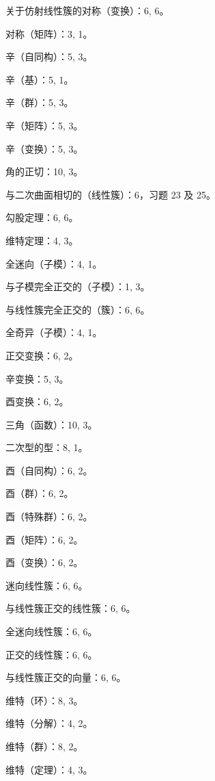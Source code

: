 关于仿射线性簇的对称（变换）：6, 6。

对称（矩阵）：3, 1。

辛（自同构）：5, 3。

辛（基）：5, 1。

辛（群）：5, 3。

辛（矩阵）：5, 3。

辛（变换）：5, 3。

角的正切：10, 3。

与二次曲面相切的（线性簇）：6，习题 23 及 25。

勾股定理：6, 6。

维特定理：4, 3。

全迷向（子模）：4, 1。

与子模完全正交的（子模）：1, 3。

与线性簇完全正交的（簇）：6, 6。

全奇异（子模）：4, 1。

正交变换：6, 2。

辛变换：5, 3。

酉变换：6, 2。

三角（函数）：10, 3。

二次型的型：8, 1。

酉（自同构）：6, 2。

酉（群）：6, 2。

酉（特殊群）：6, 2。

酉（矩阵）：6, 2。

酉（变换）：6, 2。

迷向线性簇：6, 6。

与线性簇正交的线性簇：6, 6。

全迷向线性簇：6, 6。

正交的线性簇：6, 6。

与线性簇正交的向量：6, 6。

维特（环）：8, 3。

维特（分解）：4, 2。

维特（群）：8, 2。

维特（定理）：4, 3。

